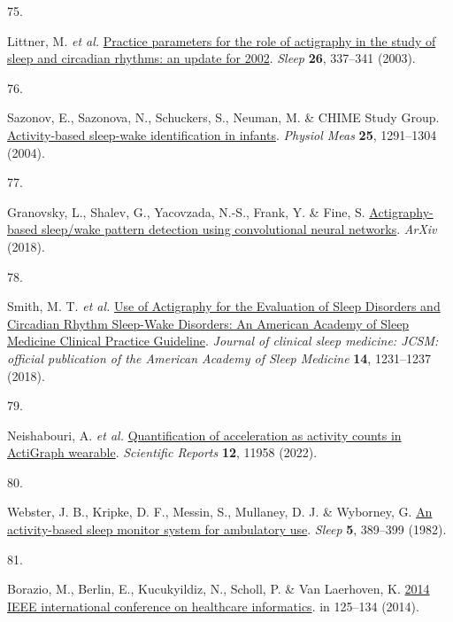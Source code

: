 \documentclass[
  10pt,
]{scrbook}
\newlength{\cslhangindent}
\newlength{\csllabelwidth}
\newlength{\cslentryspacingunit} %
\newenvironment{CSLReferences}[2] %
 {%
  \setlength{\parindent}{0pt}
  \ifodd #1
  \let\oldpar\par
  \def\par{\hangindent=\cslhangindent\oldpar}
  \fi
  \setlength{\parskip}{#2\cslentryspacingunit}
 }%
 {}
\newcommand{\CSLLeftMargin}[1]{\parbox[t]{\csllabelwidth}{#1}}
\newcommand{\CSLRightInline}[1]{\parbox[t]{\linewidth - \csllabelwidth}{#1}\break}
\let\originaltextbf\textbf
\renewcommand{\textbf}[1]{\textcolor{color1}{\textsf{\originaltextbf{#1}}}}
\begin{document}
\begin{CSLReferences}{0}{0}
\leavevmode{}%
\CSLLeftMargin{75. }%
\CSLRightInline{Littner, M. \emph{et al.}
\href{https://doi.org/10.1093/sleep/26.3.337}{Practice parameters for
the role of actigraphy in the study of sleep and circadian rhythms: an
update for 2002}. \emph{Sleep} \textbf{26}, 337--341 (2003).}

\leavevmode{}%
\CSLLeftMargin{76. }%
\CSLRightInline{Sazonov, E., Sazonova, N., Schuckers, S., Neuman, M. \&
CHIME Study Group.
\href{https://doi.org/10.1088/0967-3334/25/5/018}{Activity-based
sleep-wake identification in infants}. \emph{Physiol Meas} \textbf{25},
1291--1304 (2004).}

\leavevmode{}%
\CSLLeftMargin{77. }%
\CSLRightInline{Granovsky, L., Shalev, G., Yacovzada, N.-S., Frank, Y.
\& Fine, S.
\href{https://www.semanticscholar.org/paper/Actigraphy-based-Sleep-Wake-Pattern-Detection-using-Granovsky-Shalev/3b3043d8816e9caecb3ee2a52597da08c535bb95}{Actigraphy-based
sleep/wake pattern detection using convolutional neural networks}.
\emph{{ArXiv}} (2018).}

\leavevmode{}%
\CSLLeftMargin{78. }%
\CSLRightInline{Smith, M. T. \emph{et al.}
\href{https://doi.org/10.5664/jcsm.7230}{Use of Actigraphy for the
Evaluation of Sleep Disorders and Circadian Rhythm Sleep-Wake Disorders:
An American Academy of Sleep Medicine Clinical Practice Guideline}.
\emph{Journal of clinical sleep medicine: JCSM: official publication of
the American Academy of Sleep Medicine} \textbf{14}, 1231--1237 (2018).}

\leavevmode{}%
\CSLLeftMargin{79. }%
\CSLRightInline{Neishabouri, A. \emph{et al.}
\href{https://doi.org/10.1038/s41598-022-16003-x}{Quantification of
acceleration as activity counts in ActiGraph wearable}. \emph{Scientific
Reports} \textbf{12}, 11958 (2022).}

\leavevmode{}%
\CSLLeftMargin{80. }%
\CSLRightInline{Webster, J. B., Kripke, D. F., Messin, S., Mullaney, D.
J. \& Wyborney, G. \href{https://doi.org/10.1093/sleep/5.4.389}{An
activity-based sleep monitor system for ambulatory use}. \emph{Sleep}
\textbf{5}, 389--399 (1982).}

\leavevmode{}%
\CSLLeftMargin{81. }%
\CSLRightInline{Borazio, M., Berlin, E., Kucukyildiz, N., Scholl, P. \&
Van Laerhoven, K. \href{https://doi.org/10.1109/ICHI.2014.24}{2014 IEEE
international conference on healthcare informatics}. in 125--134
(2014).}


\end{CSLReferences}
\end{document}
